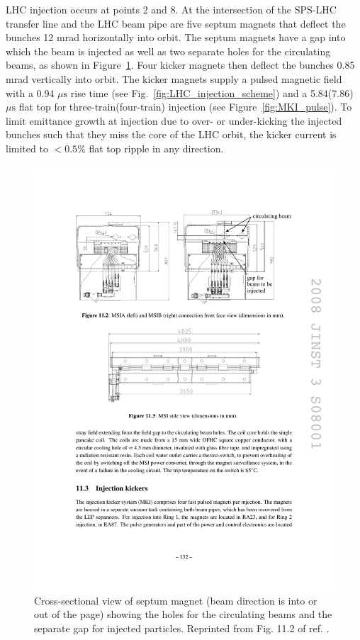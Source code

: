\documentclass[dissertation.tex]{subfiles}
\begin{document}
LHC injection occurs at points 2 and 8.  At the intersection of the SPS-LHC transfer line and the LHC beam pipe are five septum magnets that deflect the bunches 12 mrad horizontally into orbit.  The septum magnets have a gap into which the beam is injected as well as two separate holes for the circulating beams, as shown in Figure~\ref{fig:LHC_septum_cross_section}.  Four kicker magnets then deflect the bunches 0.85 mrad vertically into orbit.  The kicker magnets supply a pulsed magnetic field with a 0.94 $\mu\mbox{s}$ rise time (see Fig.~\ref{fig:LHC_injection_scheme}) and a 5.84(7.86) $\mu\mbox{s}$ flat top for three-train(four-train) injection (see Figure~\ref{fig:MKI_pulse}).  To limit emittance growth at injection due to over- or under-kicking the injected bunches such that they miss the core of the LHC orbit, the kicker current is limited to $<0.5\%$ flat top ripple in any direction.

\begin{figure}
	\centering
	\includegraphics[scale=1.0]{LHC_septum_cross_section}
	\caption{Cross-sectional view of septum magnet (beam direction is into or out of the page) showing the holes for the circulating beams and the separate gap for injected particles.  Reprinted from Fig. 11.2 of ref. \cite{1748-0221-3-08-S08001}.}
	\label{fig:LHC_septum_cross_section}
\end{figure}
\end{document}
